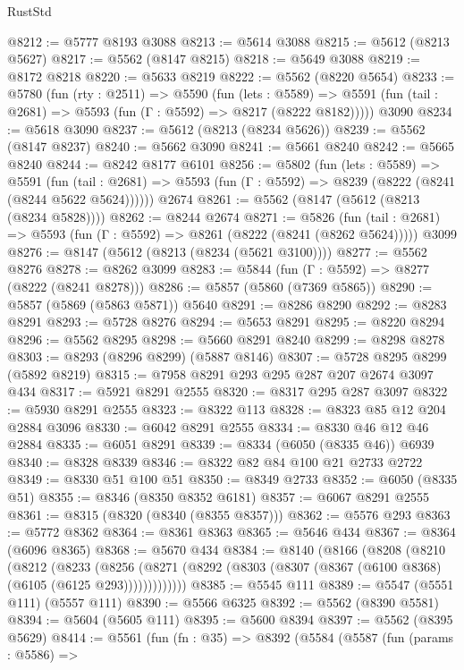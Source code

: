 \begin{lexlean}{RustStd}
\begin{coremodule}
@8212 := @5777 @8193 @3088
@8213 := @5614 @3088
@8215 := @5612 (@8213 @5627)
@8217 := @5562 (@8147 @8215)
@8218 := @5649 @3088
@8219 := @8172 @8218
@8220 := @5633 @8219
@8222 := @5562 (@8220 @5654)
@8233 := @5780
    (fun (rty : @2511) =>
    @5590
      (fun (lets : @5589) =>
      @5591 (fun (tail : @2681) => @5593 (fun (Γ : @5592) => @8217 (@8222 @8182)))))
    @3090
@8234 := @5618 @3090
@8237 := @5612 (@8213 (@8234 @5626))
@8239 := @5562 (@8147 @8237)
@8240 := @5662 @3090
@8241 := @5661 @8240
@8242 := @5665 @8240
@8244 := @8242 @8177 @6101
@8256 := @5802
    (fun (lets : @5589) =>
    @5591
      (fun (tail : @2681) => @5593 (fun (Γ : @5592) => @8239 (@8222 (@8241 (@8244 @5622 @5624))))))
    @2674
@8261 := @5562 (@8147 (@5612 (@8213 (@8234 @5828))))
@8262 := @8244 @2674
@8271 := @5826
    (fun (tail : @2681) => @5593 (fun (Γ : @5592) => @8261 (@8222 (@8241 (@8262 @5624)))))
    @3099
@8276 := @8147 (@5612 (@8213 (@8234 (@5621 @3100))))
@8277 := @5562 @8276
@8278 := @8262 @3099
@8283 := @5844 (fun (Γ : @5592) => @8277 (@8222 (@8241 @8278)))
@8286 := @5857 (@5860 (@7369 @5865))
@8290 := @5857 (@5869 (@5863 @5871)) @5640
@8291 := @8286 @8290
@8292 := @8283 @8291
@8293 := @5728 @8276
@8294 := @5653 @8291
@8295 := @8220 @8294
@8296 := @5562 @8295
@8298 := @5660 @8291 @8240
@8299 := @8298 @8278
@8303 := @8293 (@8296 @8299) (@5887 @8146)
@8307 := @5728 @8295 @8299 (@5892 @8219)
@8315 := @7958 @8291 @293 @295 @287 @207 @2674 @3097 @434
@8317 := @5921 @8291 @2555
@8320 := @8317 @295 @287 @3097
@8322 := @5930 @8291 @2555
@8323 := @8322 @113
@8328 := @8323 @85 @12 @204 @2884 @3096
@8330 := @6042 @8291 @2555
@8334 := @8330 @46 @12 @46 @2884
@8335 := @6051 @8291
@8339 := @8334 (@6050 (@8335 @46)) @6939
@8340 := @8328 @8339
@8346 := @8322 @82 @84 @100 @21 @2733 @2722
@8349 := @8330 @51 @100 @51
@8350 := @8349 @2733
@8352 := @6050 (@8335 @51)
@8355 := @8346 (@8350 @8352 @6181)
@8357 := @6067 @8291 @2555
@8361 := @8315 (@8320 (@8340 (@8355 @8357)))
@8362 := @5576 @293
@8363 := @5772 @8362
@8364 := @8361 @8363
@8365 := @5646 @434
@8367 := @8364 (@6096 @8365)
@8368 := @5670 @434
@8384 := @8140
    (@8166
      (@8208
        (@8210
          (@8212
            (@8233
              (@8256
                (@8271 (@8292 (@8303 (@8307 (@8367 (@6100 @8368) (@6105 (@6125 @293)))))))))))))
@8385 := @5545 @111
@8389 := @5547 (@5551 @111) (@5557 @111)
@8390 := @5566 @6325
@8392 := @5562 (@8390 @5581)
@8394 := @5604 (@5605 @111)
@8395 := @5600 @8394
@8397 := @5562 (@8395 @5629)
@8414 := @5561
    (fun (fn : @35) =>
    @8392
      (@5584
        (@5587
          (fun (params : @5586) =>

\end{coremodule}
\end{lexlean}

